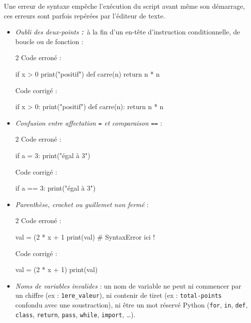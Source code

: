 \documentclass[11pt,a4paper]{article}
\begin{document}
\begin{tcolorbox}[left=0cm,title=\bf{\faBug \; 1. Erreurs de syntaxe (SyntaxError)},colbacktitle=cfond]
Une erreur de syntaxe empêche l'exécution du script avant même son démarrage, ces erreurs sont parfois repérées par l'éditeur de texte.
\begin{itemize}
	\item[\textbullet] \textit{Oubli des deux-points {\tt :}} à la fin d'un en-tête d'instruction conditionnelle, de boucle ou de fonction :
	\setlength{\multicolsep}{0pt}
	\begin{multicols}{2}
		\textcolor{BrickRed}{\faTimesCircle \; Code erroné :}
		\begin{python}
if x > 0
    print("positif")
def carre(n)
    return n * n
		\end{python}
		\textcolor{OliveGreen}{\faCheckCircle \; Code corrigé :}
		\begin{python}
if x > 0:
    print("positif")
def carre(n):
    return n * n
		\end{python}
	\end{multicols}

	\item[\textbullet] \textit{Confusion entre affectation {\tt =} et comparaison {\tt ==}} :
	\begin{multicols}{2}
		\textcolor{BrickRed}{\faTimesCircle \; Code erroné :}
		\begin{python}
if a = 3:
    print("égal à 3")
		\end{python}
		\textcolor{OliveGreen}{\faCheckCircle \; Code corrigé :}
		\begin{python}
if a == 3:
    print("égal à 3")
		\end{python}
	\end{multicols}

	\item[\textbullet] \textit{Parenthèse, crochet ou guillemet non fermé} :
	\begin{multicols}{2}
		\textcolor{BrickRed}{\faTimesCircle \; Code erroné :}
		\begin{python}
val = (2 * x + 1%
print(val) # SyntaxError ici !
		\end{python}
		\textcolor{OliveGreen}{\faCheckCircle \; Code corrigé :}
		\begin{python}
val = (2 * x + 1)
print(val)
		\end{python}
	\end{multicols}

	\item[\textbullet] \textit{Noms de variables invalides} : un nom de variable ne peut ni commencer par un chiffre (ex : {\tt 1ere\_valeur}), ni contenir de tiret (ex : {\tt total-points} confondu avec une soustraction), ni être un mot réservé Python ({\tt for}, {\tt in}, {\tt def}, {\tt class}, {\tt return}, {\tt pass}, {\tt while}, {\tt import}, \dots).
\end{itemize}
\end{tcolorbox}
\end{document}
